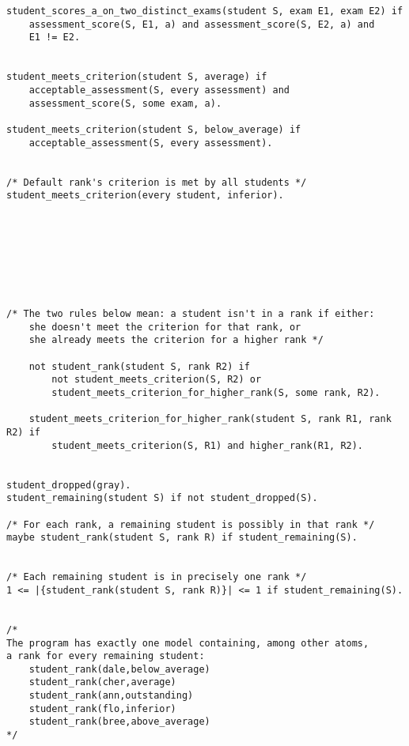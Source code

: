 \documentclass[letterpaper,10pt]{article}
\begin{document}
\begin{flushleft}
\begin{verbatim}
student_scores_a_on_two_distinct_exams(student S, exam E1, exam E2) if
    assessment_score(S, E1, a) and assessment_score(S, E2, a) and
    E1 != E2.
    
    
student_meets_criterion(student S, average) if
    acceptable_assessment(S, every assessment) and
    assessment_score(S, some exam, a).
    
student_meets_criterion(student S, below_average) if
    acceptable_assessment(S, every assessment).

    
/* Default rank's criterion is met by all students */
student_meets_criterion(every student, inferior).

    






/* The two rules below mean: a student isn't in a rank if either:
    she doesn't meet the criterion for that rank, or
    she already meets the criterion for a higher rank */
    
    not student_rank(student S, rank R2) if
        not student_meets_criterion(S, R2) or
        student_meets_criterion_for_higher_rank(S, some rank, R2).
        
    student_meets_criterion_for_higher_rank(student S, rank R1, rank R2) if
        student_meets_criterion(S, R1) and higher_rank(R1, R2).
    
    
student_dropped(gray).
student_remaining(student S) if not student_dropped(S).

/* For each rank, a remaining student is possibly in that rank */
maybe student_rank(student S, rank R) if student_remaining(S).


/* Each remaining student is in precisely one rank */
1 <= |{student_rank(student S, rank R)}| <= 1 if student_remaining(S).


/* 
The program has exactly one model containing, among other atoms, 
a rank for every remaining student:
    student_rank(dale,below_average) 
    student_rank(cher,average) 
    student_rank(ann,outstanding) 
    student_rank(flo,inferior) 
    student_rank(bree,above_average)
*/

\end{verbatim}

\end{flushleft}
\end{document}
